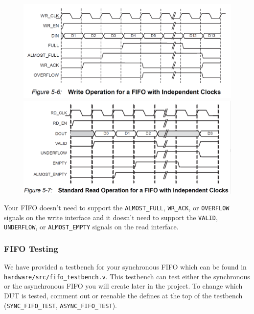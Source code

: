 \documentclass[11pt]{article}
\begin{document}
\begin{figure}[H]
	\includegraphics[width=\linewidth]{sync_fifo_write_operation.png}
	\endminipage\hfill
	\includegraphics[width=\linewidth]{sync_fifo_read_operation.png}
	\endminipage
\end{figure}

Your FIFO doesn't need to support the \verb|ALMOST_FULL|, \verb|WR_ACK|, or \verb|OVERFLOW| signals on the write interface and it doesn't need to support the \verb|VALID|, \verb|UNDERFLOW|, or \verb|ALMOST_EMPTY| signals on the read interface.

\subsubsection*{FIFO Testing}
We have provided a testbench for your synchronous FIFO which can be found in \verb|hardware/src/fifo_testbench.v|. This testbench can test either the synchronous or the asynchronous FIFO you will create later in the project. To change which DUT is tested, comment out or reenable the defines at the top of the testbench (\verb|SYNC_FIFO_TEST|, \verb|ASYNC_FIFO_TEST|).
\end{document}
